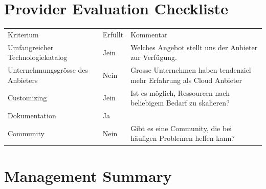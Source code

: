 \documentclass[12pt,a4paper]{article}
\begin{document}
\section{Provider Evaluation Checkliste}
    \begin{table}[]
        \begin{tabular}{lll}
            Kriterium & Erfüllt & Kommentar                                                                                 \\
            Umfangreicher Technologiekatalog & Jein & Welches Angebot stellt uns der Anbieter zur Verfügung.                \\
            Unternehmungsgrösse des Anbieters & Nein & Grosse Unternehmen haben tendenziel mehr Erfahrung als Cloud Anbieter\\
            Customizing & Jein & Ist es möglich, Ressourcen nach beliebigem Bedarf zu skalieren?                            \\
            Dokumentation & Ja &                                                                                            \\
            Community & Nein & Gibt es eine Community, die bei häufigen Problemen helfen kann?                              \\
        \end{tabular}
    \end{table}

\section{Management Summary}
\end{document}

